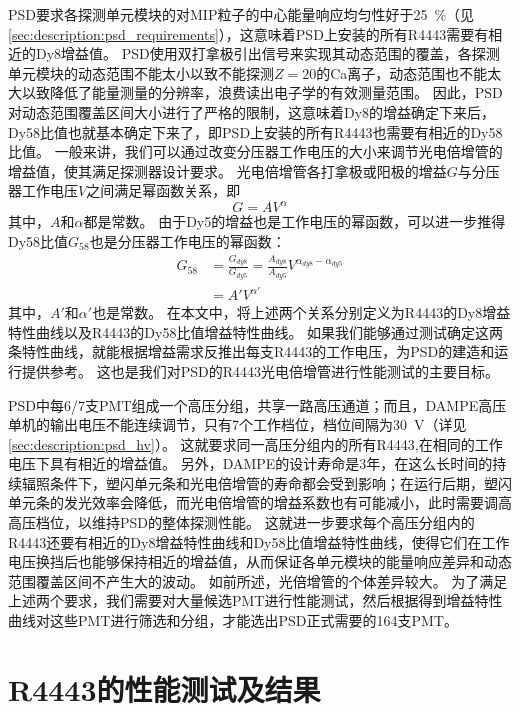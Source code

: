 PSD要求各探测单元模块的对MIP粒子的中心能量响应均匀性好于\SI{25}{\percent}（见\ref{sec:description:psd_requirements}），这意味着PSD上安装的所有R4443需要有相近的Dy8增益值。
PSD使用双打拿极引出信号来实现其动态范围的覆盖，各探测单元模块的动态范围不能太小以致不能探测$Z=20$的Ca离子，动态范围也不能太大以致降低了能量测量的分辨率，浪费读出电子学的有效测量范围。
因此，PSD对动态范围覆盖区间大小进行了严格的限制，这意味着Dy8的增益确定下来后，Dy58比值也就基本确定下来了，即PSD上安装的所有R4443也需要有相近的Dy58比值。
一般来讲，我们可以通过改变分压器工作电压的大小来调节光电倍增管的增益值，使其满足探测器设计要求。
光电倍增管各打拿极或阳极的增益$G$与分压器工作电压$V$之间满足幂函数关系，即
\begin{equation}
	G = A V^\alpha
	\label{eq:pmt_test:gain_powerfunction}
\end{equation}
其中，$A$和$\alpha$都是常数。
由于Dy5的增益也是工作电压的幂函数，可以进一步推得Dy58比值$G_{58}$也是分压器工作电压的幂函数：
\begin{align}
	G_{58} &= \frac{G_{dy8}}{G_{dy5}} = \frac{A_{dy8}}{A_{dy5}} V^{\alpha_{dy8}-\alpha_{dy5}}      \\
		   &= A' V^{\alpha'}
	\label{eq:pmt_test:dy58_powerlaw}
\end{align}
其中，$A'$和$\alpha'$也是常数。
在本文中，将上述两个关系分别定义为R4443的Dy8增益特性曲线以及R4443的Dy58比值增益特性曲线。
如果我们能够通过测试确定这两条特性曲线，就能根据增益需求反推出每支R4443的工作电压，为PSD的建造和运行提供参考。
这也是我们对PSD的R4443光电倍增管进行性能测试的主要目标。

PSD中每6/7支PMT组成一个高压分组，共享一路高压通道；而且，DAMPE高压单机的输出电压不能连续调节，只有7个工作档位，档位间隔为\SI{30}{V}（详见\ref{sec:description:psd_hv}）。
这就要求同一高压分组内的所有R4443,在相同的工作电压下具有相近的增益值。
另外，DAMPE的设计寿命是3年，在这么长时间的持续辐照条件下，塑闪单元条和光电倍增管的寿命都会受到影响；在运行后期，塑闪单元条的发光效率会降低，而光电倍增管的增益系数也有可能减小，此时需要调高高压档位，以维持PSD的整体探测性能。
这就进一步要求每个高压分组内的R4443还要有相近的Dy8增益特性曲线和Dy58比值增益特性曲线，使得它们在工作电压换挡后也能够保持相近的增益值，从而保证各单元模块的能量响应差异和动态范围覆盖区间不产生大的波动。
如前所述，光倍增管的个体差异较大。
为了满足上述两个要求，我们需要对大量候选PMT进行性能测试，然后根据得到增益特性曲线对这些PMT进行筛选和分组，才能选出PSD正式需要的164支PMT。

\section{R4443的性能测试及结果}
\label{sec:pmt_test:characterization}
